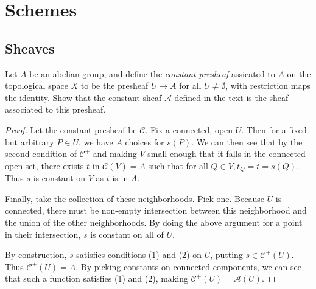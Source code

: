 \section{Schemes}

\subsection{Sheaves}

\begin{exercise}%
	Let $A $ be an abelian group, and define the \textit{constant presheaf} assicated to $A $ on the topological space $X $ to be the presheaf $U\mapsto A $ for all $U\ne \emptyset $, with restriction maps the identity. Show that the constant sheaf $\mathscr{A} $ defined in the text is the sheaf associated to this presheaf.
\end{exercise}
\begin{proof}
	Let the constant presheaf be $\mathscr{C} $.
	Fix a connected, open $U $.
	Then for a fixed but arbitrary $P \in U $, we have $A $ choices for $s(P) $.
	We can then see that by the second condition of $\mathscr{C}^+ $ and making $V $ small enough that it falls in the connected open set, there exists $t$ in $\mathscr{C}(V) = A$ such that for all $Q \in V, t_Q = t = s(Q)$.
	Thus $s $ is constant on $V $ as $t $ is in $A $.

	Finally, take the collection of these neighborhoods.
	Pick one.
	Because $U $ is connected, there must be non-empty intersection between this neighborhood and the union of the other neighborhoods.
	By doing the above argument for a point in their intersection, $s $ is constant on all of $U $.

	By construction, $s $ satisfies conditions (1) and (2) on $U $, putting $s \in \mathscr{C}^+(U) $.
	Thus $\mathscr{C}^+(U) = A $.
	By picking constants on connected components, we can see that such a function satisfies (1) and (2), making $\mathscr{C}^+(U) = \mathscr{A}(U) $.
\end{proof}

